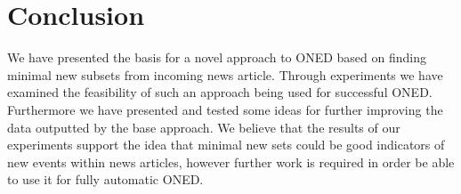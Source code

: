\chapter{Conclusion}
\label{chapter:conclusion}
We have presented the basis for a novel approach to ONED based on finding minimal new subsets from incoming news article. Through experiments we have examined the feasibility of such an approach being used for successful ONED. Furthermore we have presented and tested some ideas for further improving the data outputted by the base approach. We believe that the results of our experiments support the idea that minimal new sets could be good indicators of new events within news articles, however further work is required in order be able to use it for fully automatic ONED.

